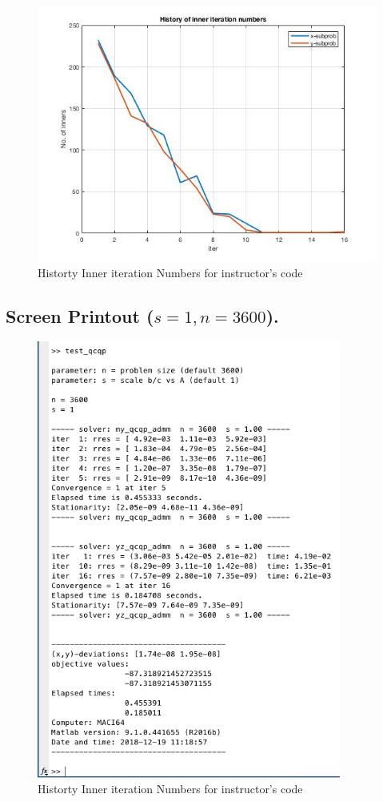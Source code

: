 \begin{figure}[H]
\centering
\includegraphics[width=12cm]{F_2/F_1_4.jpg}
\caption{Historty Inner iteration Numbers for instructor's code}
\end{figure}
\subsection{Screen Printout ($s=1,n=3600$).}
\begin{figure}[H]
\centering
\includegraphics[width=10cm]{F_2/F_1_1.png}
\caption{Historty Inner iteration Numbers for instructor's code}
\end{figure}





